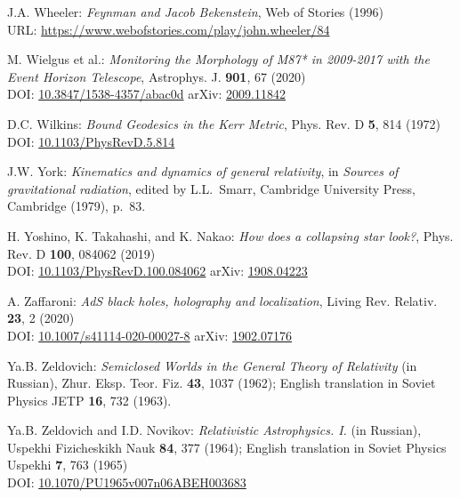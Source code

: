 \begin{thebibliography}{123}
J.A. Wheeler:
{\em Feynman and Jacob Bekenstein},
Web of Stories (1996)\\
URL: \url{https://www.webofstories.com/play/john.wheeler/84}

M. Wielgus et al.:
{\em Monitoring the Morphology of M87* in 2009-2017 with the Event Horizon Telescope},
Astrophys. J. {\bf 901}, 67 (2020)\\
DOI: \href{https://doi.org/10.3847/1538-4357/abac0d}{10.3847/1538-4357/abac0d}\hfill
arXiv: \href{https://arxiv.org/abs/2009.11842}{2009.11842}

D.C. Wilkins:
{\em Bound Geodesics in the Kerr Metric},
Phys. Rev. D {\bf 5}, 814 (1972)\\
DOI: \href{https://doi.org/10.1103/PhysRevD.5.814}{10.1103/PhysRevD.5.814}

J.W. York:
{\em Kinematics and dynamics of general relativity},
in {\em Sources of gravitational radiation}, edited by L.L.~Smarr,
Cambridge University Press, Cambridge (1979), p.~83.

H. Yoshino, K. Takahashi, and K. Nakao:
{\em How does a collapsing star look?},
Phys. Rev. D {\bf 100}, 084062 (2019)\\
DOI: \href{https://doi-org.ezproxy.obspm.fr/10.1103/PhysRevD.100.084062}{10.1103/PhysRevD.100.084062}\hfill
arXiv: \href{https://arxiv.org/abs/1908.04223}{1908.04223}

A. Zaffaroni:
{\em AdS black holes, holography and localization},
Living Rev. Relativ. {\bf 23}, 2 (2020)\\
DOI: \href{https://doi.org/10.1007/s41114-020-00027-8}{10.1007/s41114-020-00027-8}\hfill
arXiv: \href{https://arxiv.org/abs/1902.07176}{1902.07176}


Ya.B. Zeldovich:
{\em Semiclosed Worlds in the General Theory of Relativity} (in Russian),
Zhur. Eksp. Teor. Fiz. {\bf 43}, 1037 (1962); English translation in
Soviet Physics JETP {\bf 16}, 732 (1963).

Ya.B. Zeldovich and I.D. Novikov:
{\em Relativistic Astrophysics. I.} (in Russian),
Uspekhi Fizicheskikh Nauk {\bf 84}, 377 (1964);
English translation in Soviet Physics Uspekhi {\bf 7}, 763 (1965)\\
DOI: \href{https://doi.org/10.1070/PU1965v007n06ABEH003683}{10.1070/PU1965v007n06ABEH003683}


\end{thebibliography}
